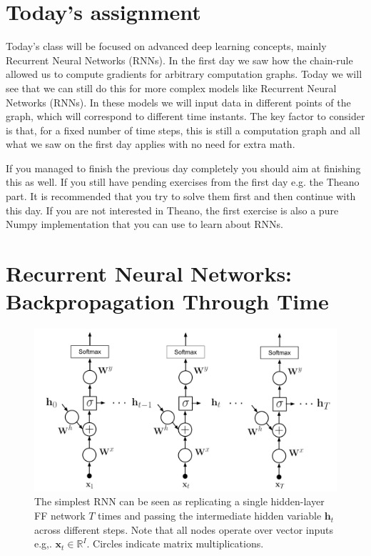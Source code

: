 \section{Today's assignment}
Today's class will be focused on advanced deep learning concepts, mainly
Recurrent Neural Networks (RNNs). In the first day we saw how the chain-rule
allowed us to compute gradients for arbitrary computation graphs. Today we will
see that we can still do this for more complex models like Recurrent Neural
Networks (RNNs). In these models we will input data in different points of the
graph, which will correspond to different time instants. The key factor to
consider is that, for a fixed number of time steps, this is still a computation
graph and all what we saw on the first day applies with no need for extra math.

If you managed to finish the previous day completely you should aim at finishing
this as well. If you still have pending exercises from the first day e.g. the
Theano part. It is recommended that you try to solve them first and then
continue with this day. If you are not interested in Theano, the first exercise is
also a pure Numpy implementation that you can use to learn about RNNs.

\section{Recurrent Neural Networks: Backpropagation Through Time}

\begin{figure}[!h]
\centering
\includegraphics[scale=0.6]{figs/deep_learning/RNN.pdf}
\caption{The simplest RNN can be seen as replicating a single hidden-layer FF
network $T$ times and passing the intermediate hidden variable $\mathbf{h}_t$
across different steps. Note that all nodes operate over vector inputs e.g,.
$\mathbf{x}_t \in \mathbb{R}^I$. Circles indicate matrix multiplications.}
\label{fig:RNN}
\end{figure}

